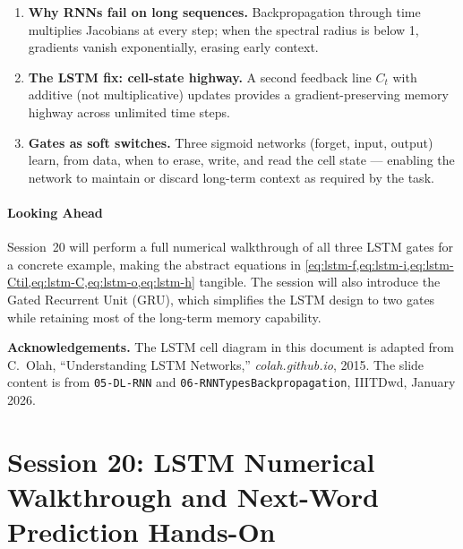 \documentclass[12pt,a4paper]{article}
\begin{document}
\begin{keyinsight}[title=The Three Core Ideas of Session 19]
  \begin{enumerate}[nosep,label=\textbf{\arabic*.}]
    \item \textbf{Why RNNs fail on long sequences.} Backpropagation
          through time multiplies Jacobians at every step; when the
          spectral radius is below 1, gradients vanish exponentially,
          erasing early context.
    \item \textbf{The LSTM fix: cell-state highway.} A second feedback
          line $C_t$ with additive (not multiplicative) updates provides a
          gradient-preserving memory highway across unlimited time steps.
    \item \textbf{Gates as soft switches.} Three sigmoid networks
          (forget, input, output) learn, from data, when to erase, write,
          and read the cell state --- enabling the network to maintain or
          discard long-term context as required by the task.
  \end{enumerate}
\end{keyinsight}

\subsection{Looking Ahead}
\label{subsec:looking-ahead}

Session~20 will perform a full numerical walkthrough of all three LSTM
gates for a concrete example, making the abstract equations in
\cref{eq:lstm-f,eq:lstm-i,eq:lstm-Ctil,eq:lstm-C,eq:lstm-o,eq:lstm-h}
tangible. The session will also introduce the Gated Recurrent Unit (GRU),
which simplifies the LSTM design to two gates while retaining most of the
long-term memory capability.

\medskip
\noindent\textbf{Acknowledgements.} The LSTM cell diagram in this document
is adapted from C.\ Olah, ``Understanding LSTM Networks,''
\textit{colah.github.io}, 2015. The slide content is from
\texttt{05-DL-RNN} and \texttt{06-RNNTypesBackpropagation},
IIITDwd, January 2026.

\clearpage

\part{Session 20: LSTM Numerical Walkthrough and Next-Word Prediction Hands-On}
\end{document}
